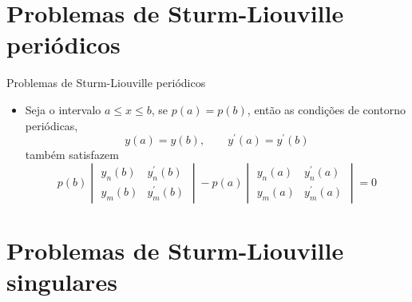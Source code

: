    \section[ slide = true ]{Problemas de Sturm-Liouville periódicos}
      \begin{slide}[toc=]{Problemas de Sturm-Liouville periódicos}
	      \begin{itemize}
		      \item Seja o intervalo $a\leq x \leq b$, se $p(a) = p(b)$, então as condições de contorno periódicas, 
			      \begin{equation*}
				      y(a) = y(b), \qquad y^\prime (a)= y^\prime (b)
			      \end{equation*}
			      também satisfazem 
				\begin{equation*}
					p(b)\begin{vmatrix}y_n(b) & y_n^\prime(b)\\ y_m(b) & y_m^\prime(b)\end{vmatrix}-p(a)\begin{vmatrix}y_n(a) & y_n^\prime(a)\\ y_m(a) & y_m^\prime(a)\end{vmatrix}= 0
				\end{equation*}
	      \end{itemize}
      \end{slide}
   
   \section[ slide = true ]{Problemas de Sturm-Liouville singulares}
      
	
